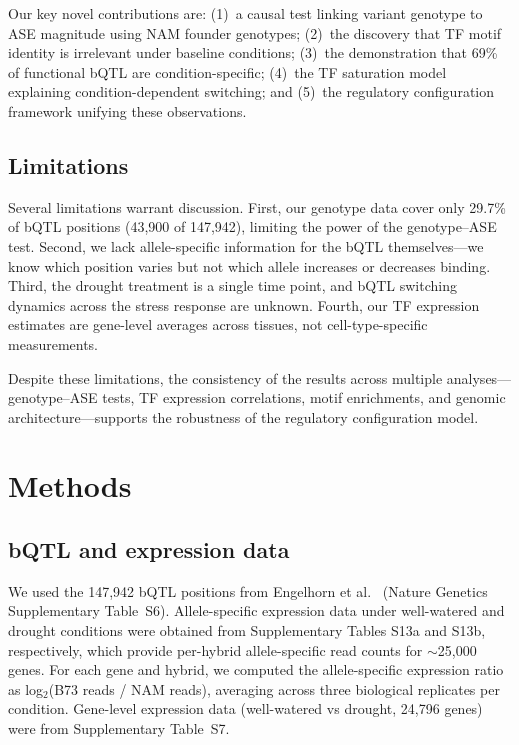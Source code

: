 \documentclass[10pt,letterpaper]{article}
\begin{document}
Our key novel contributions are: (1)~a causal test linking variant genotype
to ASE magnitude using NAM founder genotypes; (2)~the discovery that TF motif
identity is irrelevant under baseline conditions; (3)~the demonstration that
69\% of functional bQTL are condition-specific; (4)~the TF saturation model
explaining condition-dependent switching; and (5)~the regulatory
configuration framework unifying these observations.

\subsection*{Limitations}

Several limitations warrant discussion. First, our genotype data cover only
29.7\% of bQTL positions (43,900 of 147,942), limiting the power of the
genotype--ASE test. Second, we lack allele-specific information for the bQTL
themselves---we know which position varies but not which allele increases or
decreases binding. Third, the drought treatment is a single time point, and
bQTL switching dynamics across the stress response are unknown. Fourth, our
TF expression estimates are gene-level averages across tissues, not
cell-type-specific measurements.

Despite these limitations, the consistency of the results across multiple
analyses---genotype--ASE tests, TF expression correlations, motif enrichments,
and genomic architecture---supports the robustness of the regulatory
configuration model.


\section*{Methods}

\subsection*{bQTL and expression data}

We used the 147,942 bQTL positions from Engelhorn et al.\ \cite{engelhorn2025}
(Nature Genetics Supplementary Table~S6). Allele-specific expression data
under well-watered and drought conditions were obtained from Supplementary
Tables S13a and S13b, respectively, which provide per-hybrid allele-specific
read counts for $\sim$25,000 genes. For each gene and hybrid, we computed the
allele-specific expression ratio as log$_2$(B73 reads / NAM reads),
averaging across three biological replicates per condition. Gene-level
expression data (well-watered vs drought, 24,796 genes) were from
Supplementary Table~S7.
\end{document}
